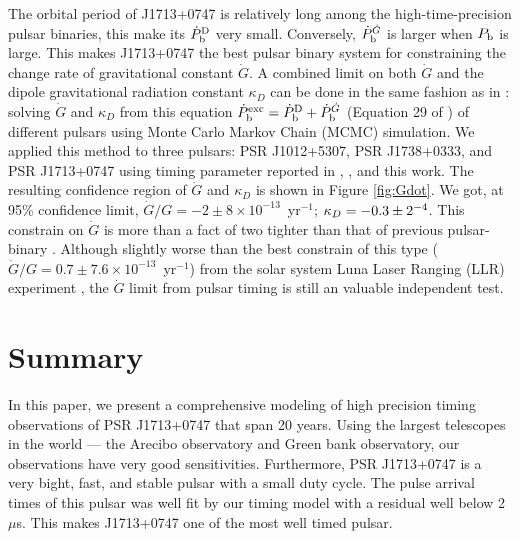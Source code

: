 The orbital period of J1713+0747 is relatively long among the
high-time-precision pulsar binaries, this make its $\dot{P}_{\rm b}^{\rm D}$
very small. Conversely, $\dot{P}_{\rm b}^{\dot{G}}$ is larger when $P_{\rm b}$
is large. This makes J1713+0747 the best pulsar binary system for constraining
the change rate of gravitational constant $\dot{G}$. A combined limit on both
$\dot{G}$ and the dipole gravitational radiation constant $\kappa_D$ can be
done in the same fashion as in \citet{lwj+09}: solving $\dot{G}$ and $\kappa_D$
from this equation $\dot{P}_{\rm b}^{\rm exc} = \dot{P}_{\rm b}^{\rm D} +
\dot{P}_{\rm b}^{\dot{G}}$ (Equation 29 of \citealt{lwj+09}) of different
pulsars using Monte Carlo Markov Chain (MCMC) simulation. We applied this method to three pulsars: PSR J1012+5307, PSR
J1738+0333, and PSR J1713+0747 using timing parameter reported in
\citet{lwj+09}, \citet{fwe+12}, and this work.
The resulting confidence region of $\dot{G}$ and $\kappa_D$ is shown in Figure
\ref{fig:Gdot}.
We got, at 95\% confidence limit, $\dot{G}/G = -2\pm8\times10^{-13}$~yr$^{-1}$;
$\kappa_D=-0.3\pm2\time10^{-4}$. 
This constrain on $\dot{G}$ is more than a fact of two tighter than that of
previous pulsar-binary \citep{fwe+12}. 
Although slightly worse than
the best constrain of this type ($\dot{G}/G=0.7\pm7.6\times10^{-13}$~yr$^{-1}$) from the solar system Luna Laser Ranging (LLR) experiment \citep{hmb10}, the $\dot{G}$ limit from pulsar timing is still an valuable independent test.  



\section{Summary}
In this paper, we present a comprehensive modeling of high precision timing observations of
PSR J1713+0747 that span 20 years. 
Using the largest telescopes in the world --- the Arecibo observatory and
Green bank observatory, our observations have very good sensitivities.  
Furthermore, PSR J1713+0747 is a very bight, fast, and stable  pulsar with a
small duty cycle.
The pulse arrival times of this pulsar was well fit by our timing model with a
residual well below 2$\mu$s.
This makes J1713+0747 one of the most well timed pulsar.

